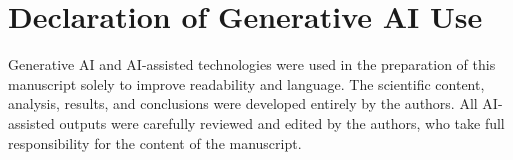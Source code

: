\documentclass[10pt,twoside,twocolumn,a4paper]{article}
\begin{document}
\section*{Declaration of Generative AI Use}
Generative AI and AI-assisted technologies were used in the preparation of this manuscript solely to improve readability and language. The scientific content, analysis, results, and conclusions were developed entirely by the authors. All AI-assisted outputs were carefully reviewed and edited by the authors, who take full responsibility for the content of the manuscript.





\end{document}
